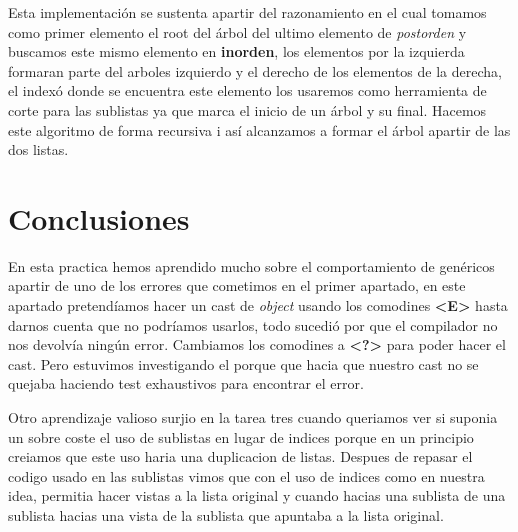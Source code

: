 \documentclass{article}
\begin{document}
Esta implementación se sustenta apartir del razonamiento en el cual tomamos como
primer elemento el root del árbol del ultimo elemento de \textit{postorden} y
buscamos este mismo elemento en \textbf{inorden}, los elementos por la izquierda formaran
parte del arboles izquierdo y el derecho de los elementos de la derecha, el
indexó donde se encuentra este elemento los usaremos como herramienta de corte
para las sublistas ya que marca el inicio de un árbol y su final. Hacemos este
algoritmo de forma recursiva i así alcanzamos a formar el árbol apartir de las
dos listas.
\section{Conclusiones}
En esta practica hemos aprendido mucho sobre el comportamiento de genéricos
apartir de uno de los errores que cometimos en el primer apartado, en este
apartado pretendíamos hacer un cast de \textit{object} usando los comodines
\textbf{<E>} hasta darnos cuenta que no podríamos usarlos, todo sucedió por que
el compilador no nos devolvía ningún error. Cambiamos los comodines a
\textbf{<?>} para poder hacer el cast. Pero estuvimos investigando el porque que
hacia que nuestro cast no se quejaba haciendo test exhaustivos para encontrar el
error.

Otro aprendizaje valioso surjio en la tarea tres cuando queriamos ver si suponia
un sobre coste el uso de sublistas en lugar de indices porque en un principio
creiamos que este uso haria una duplicacion de listas. Despues de repasar el
codigo usado en las sublistas vimos que con el uso de indices como en nuestra
idea, permitia hacer vistas a la lista original y cuando hacias una sublista de
una sublista hacias una vista de la sublista que apuntaba a la lista original.
\end{document}
